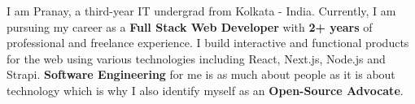 
I am Pranay, a third-year IT undergrad from Kolkata - India. Currently, I am pursuing my career as a \textbf{Full Stack Web Developer} with \textbf{2+ years} of professional and freelance experience. I build interactive and functional products for the web using various technologies including React, Next.js, Node.js and Strapi. \textbf{Software Engineering} for me is as much about people as it is about technology which is why I also identify myself as an \textbf{Open-Source Advocate}.
